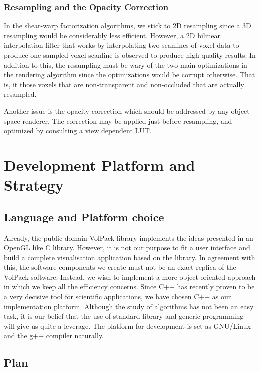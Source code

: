 \documentclass[a4paper,12pt]{article}
\begin{document}
\subsubsection{Resampling and the Opacity Correction}
In the shear-warp factorization algorithms, we stick to 2D resampling
since a 3D resampling would be considerably less efficient. However,
a 2D bilinear interpolation filter that works by interpolating two
scanlines of voxel data to produce one sampled voxel scanline is
observed to produce high quality results. In
addition to this, the resampling must be wary of the two main
optimizations in the rendering algorithm since the optimizations would
be corrupt otherwise. That is, it those voxels that are
non-transparent and non-occluded that are actually resampled.

Another issue is the opacity correction which should be addressed by
any object space renderer. The correction may be applied just before
resampling, and optimized by consulting a view dependent LUT.


\section{Development Platform and Strategy}

\subsection{Language and Platform choice}

Already, the public domain VolPack library implements the ideas
presented in an OpenGL like C library. However, it is not our
purpose to fit a user interface and build a complete visualisation
application based on the library. In agreement with this, the software
components we create must not be an exact replica of the VolPack
software. Instead, we wish to implement a more object oriented
approach in which we keep all the efficiency
concerns. Since C++ has recently proven to be a very decisive tool for
scientific applications, we have chosen C++ as our implementation
platform. Although the study of algorithms has not been an easy task,
it is our belief that the use of standard library and generic
programming will give us quite a leverage. The platform for
development is set as GNU/Linux and the g++ compiler naturally.

\subsection{Plan}
\end{document}
